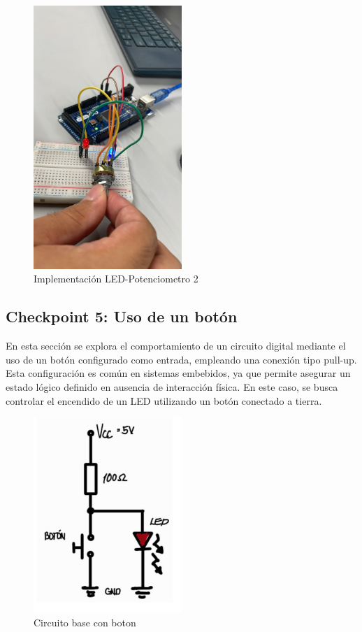 \documentclass{article}
\begin{document}
\begin{figure}[H]
    \centering
    \includegraphics[width=0.50\textwidth]{./img/chkp-3-4-1.jpeg}
    \caption{Implementación LED-Potenciometro 2}
    \label{fig:simulacion_esquema6}
\end{figure}

\subsection{Checkpoint 5: Uso de un botón}
En esta sección se explora el comportamiento de un circuito digital mediante el uso de un botón configurado como entrada, empleando una conexión tipo pull-up. Esta configuración es común en sistemas embebidos, ya que permite asegurar un estado lógico definido en ausencia de interacción física. En este caso, se busca controlar el encendido de un LED utilizando un botón conectado a tierra.

\begin{figure}[H]
    \centering
    \includegraphics[width=0.50\textwidth]{./img/Circuito-boton.png}
    \caption{Circuito base con boton}
    \label{fig:simulacion_esquema7}
\end{figure}
\end{document}

